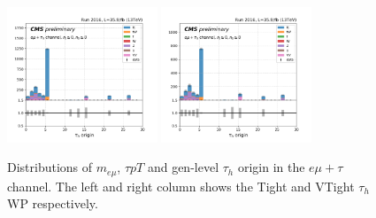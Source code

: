 \begin{figure}
    \includegraphics[width=0.4\textwidth]{chapters/Appendix/sectionJetToTauh/figures/emutau_tauGenFlavor_pickles_lltauTight.png}
    \includegraphics[width=0.4\textwidth]{chapters/Appendix/sectionJetToTauh/figures/emutau_tauGenFlavor_pickles_lltauVTight.png}
    \caption{Distributions of $m_{e\mu}$, $\tau pT$ and gen-level $\tau_h$ origin in the $e\mu+\tau$ channel. The left and right column shows the Tight and VTight $\tau_h$ WP respectively.}
    \label{fig:appendix:fakeTauId:emutau}
\end{figure}

